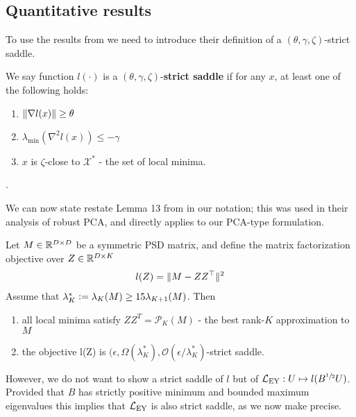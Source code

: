 \subsection{Quantitative results}\label{sec:no-spurious-local-minima-quantitative}
To use the results from \citet{ge_no_2017} we need to introduce their definition of a $(\theta, \gamma, \zeta)$-strict saddle.

\begin{definition}
    We say function $l(\cdot)$ is a $(\theta, \gamma, \zeta)$-\textbf{strict saddle} if for any $x$, at least one of the following holds:
    \begin{enumerate}
        \item $\lVert\nabla l (x)\rVert \geq \theta$
        \item $\lambda_{\text{min}}(\nabla^2 l(x)) \leq - \gamma$
        \item $x$ is $\zeta$-close to $\mathcal{X}^*$ - the set of local minima.
    \end{enumerate}.
\end{definition}

We can now state restate Lemma 13 from \citet{ge_no_2017} in our notation; this was used in their analysis of robust PCA, and directly applies to our PCA-type formulation.
\begin{lemma}\label{lem:strict-saddle-pca}
Let $M \in \mathbb{R}^{D \times D}$ be a symmetric PSD matrix, and define the matrix factorization objective over $Z \in \mathbb{R}^{D \times K}$
\begin{align*}
    l(Z) = \lVert M - Z Z^\top\rVert^2
\end{align*}
Assume that $\lambda^*_K \vcentcolon= \lambda_K(M) \geq 15 \lambda_{K+1}(M)$.
Then
\begin{enumerate}
    \item all local minima satisfy $Z Z^T = \mathcal{P}_K(M)$ - the best rank-$K$ approximation to $M$
    \item the objective l(Z) is $(\epsilon, \Omega(\lambda_K^*), \mathcal{O}(\epsilon / \lambda_K^*)$-strict saddle.
\end{enumerate}
\end{lemma}

However, we do not want to show a strict saddle of $l$ but of $\mathcal{L}_\text{EY}: U \mapsto l(B^{\sfrac{1}{2}} U)$. Provided that $B$ has strictly positive minimum and bounded maximum eigenvalues this implies that $\mathcal{L}_\text{EY}$ is also strict saddle, as we now make precise.

